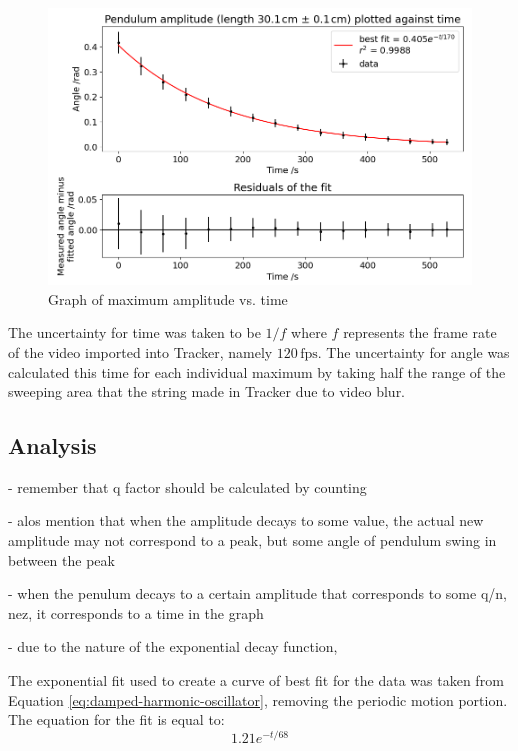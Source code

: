 \documentclass[12pt]{article}
\begin{document}
\begin{figure}[!hptb]
    \centering
    \includegraphics[width=\textwidth]{../figures/max_amplitude_vs_time.png}
    \caption{\centering Graph of maximum amplitude vs. time}
    \label{fig:figure 4}
\end{figure}

The uncertainty for time was taken to be $1/f$ where $f$ represents the frame rate of the video imported into Tracker, namely $120\,\text{fps}$. The uncertainty for angle was calculated this time for each individual maximum by taking half the range of the sweeping area that the string made in Tracker due to video blur.


\subsection{Analysis}

{\color{blue}

- remember that q factor should be calculated by counting

- alos mention that when the amplitude decays to some value, the actual new amplitude may not correspond to a peak, but some angle of pendulum swing in between the peak


- when the penulum decays to a certain amplitude that corresponds to some q/n, nez, it corresponds to a time in the graph

- due to the nature of the exponential decay function,

}


The exponential fit used to create a curve of best fit for the data was taken from Equation \ref{eq:damped-harmonic-oscillator}, removing the periodic motion portion. The equation for the fit is equal to:
\begin{equation}
    1.21e^{-{t}/68}
\end{equation}
\end{document}
